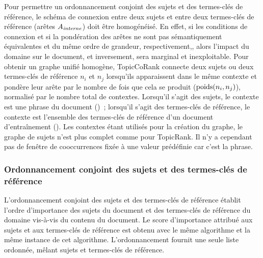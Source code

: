         Pour permettre un ordonnancement conjoint des sujets et des termes-clés
        de référence, le schéma de connexion entre deux sujets et entre deux
        termes-clés de référence (arêtes $A_\textnormal{\textit{interne}}$) doit
        être homogénéisé. En effet, si les conditions de connexion et si la
        pondération des arêtes ne sont pas sémantiquement équivalentes et du
        même ordre de grandeur, respectivement,, alors l'impact du domaine sur
        le document, et inversement, sera marginal et inexploitable. Pour
        obtenir un graphe unifié homogène, TopicCoRank connecte deux sujets ou
        deux termes-clés de référence $n_i$ et $n_j$ lorsqu'ils apparaissent
        dans le même contexte et pondère leur arête par le nombre de fois que
        cela se produit ($\textnormal{poids}(n_i, n_j)$), normalisé par le
        nombre total de contextes. Lorsqu'il s'agit des sujets, le contexte est
        une phrase du document ()~; lorsqu'il s'agit des
        termes-clés de référence, le contexte est l'ensemble des termes-clés de
        référence d'un document d'entraînement (). Les contextes
        étant utilisés pour la création du graphe, le graphe de sujets n'est
        plus complet comme pour TopicRank. Il n'y a  cependant pas de fenêtre de
        cooccurrences fixée à une valeur prédéfinie car c'est la phrase.

      \subsubsection{Ordonnancement conjoint des sujets et des termes-clés de référence}
      \label{subsubsec:main-domain_specific_keyphrase_annotation-supervised_automatic_keyphrase_extraction-topiccorank-co_ranking}
        L'ordonnancement conjoint des sujets et des termes-clés de référence
        établit l'ordre d'importance des sujets du document et des termes-clés
        de référence du domaine vis-à-vis du contenu du document. Le score
        d'importance attribué aux sujets et aux termes-clés de référence est
        obtenu avec le même algorithme et la même instance de cet algorithme.
        L'ordonnancement fournit une seule liste ordonnée, mêlant sujets et
        termes-clés de référence.

